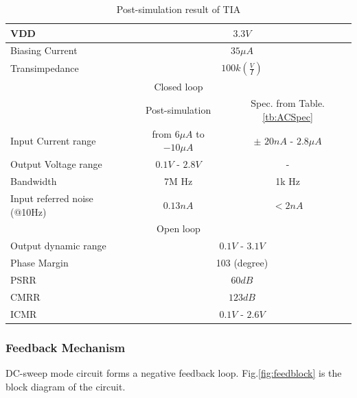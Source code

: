 {\begin{table}[!htb]
    {\fontfamily{}\fontsize{10}{14}\selectfont
    \centering
    \begin{tabular}{l|c|c}
        VDD & \multicolumn{2}{c}{$3.3V$} \\
        \hline
        Biasing Current & \multicolumn{2}{c}{$35\mu A$} \\
        \hline
        Transimpedance & \multicolumn{2}{c}{$100k (\frac{V}{I})$} \\
        \hline
        \hline
        \multicolumn{3}{c}{Closed loop} \\
        \hline
        & Post-simulation & Spec. from Table.\ref{tb:ACSpec} \\
        \hline
        Input Current range & from $6\mu A$ to $-10\mu A$ & $\pm$ $20n A$ - $2.8\mu A$\\
        \hline
        Output Voltage range &$0.1V$ - $2.8V$ & - \\
        \hline
        Bandwidth &7M Hz & 1k Hz \\
        \hline
        Input referred noise (@10Hz) & $0.13n A$  &  $< 2n A$\\
        \hline
        \hline
        \multicolumn{3}{c}{Open loop} \\
        \hline
        Output dynamic range & \multicolumn{2}{c}{$0.1V$ - $3.1 V$} \\
        \hline
        Phase Margin &\multicolumn{2}{c}{103 (degree)} \\
        \hline
        PSRR &\multicolumn{2}{c}{$60 dB$ }\\
        \hline
        CMRR &\multicolumn{2}{c}{$123 dB$} \\
        \hline
        ICMR &\multicolumn{2}{c}{$0.1 V$ - $2.6 V$} \\
    \end{tabular}
    \caption{Post-simulation result of TIA}
    \label{tb:TIAsim}
    }
\end{table}

\subsubsection{Feedback Mechanism} \label{sec:feedM}
DC-sweep mode circuit forms a negative feedback loop.
Fig.\ref{fig:feedblock} is the block diagram of the circuit.

}
